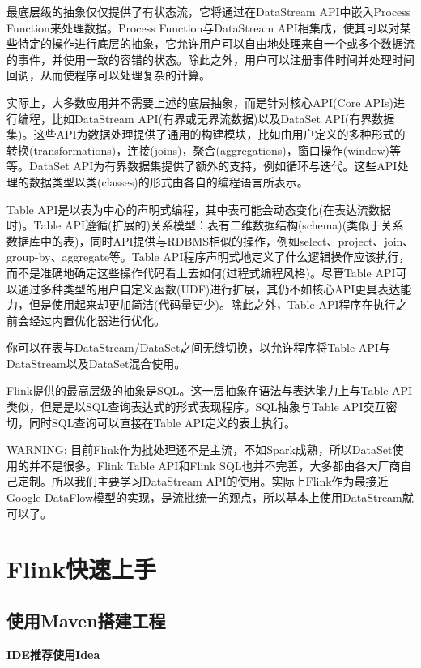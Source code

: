\documentclass{ctexart}
\begin{document}
最底层级的抽象仅仅提供了有状态流，它将通过在DataStream API中嵌入Process Function来处理数据。Process Function与DataStream API相集成，使其可以对某些特定的操作进行底层的抽象，它允许用户可以自由地处理来自一个或多个数据流的事件，并使用一致的容错的状态。除此之外，用户可以注册事件时间并处理时间回调，从而使程序可以处理复杂的计算。

实际上，大多数应用并不需要上述的底层抽象，而是针对核心API(Core APIs)进行编程，比如DataStream API(有界或无界流数据)以及DataSet API(有界数据集)。这些API为数据处理提供了通用的构建模块，比如由用户定义的多种形式的转换(transformations)，连接(joins)，聚合(aggregations)，窗口操作(window)等等。DataSet API为有界数据集提供了额外的支持，例如循环与迭代。这些API处理的数据类型以类(classes)的形式由各自的编程语言所表示。

Table API是以表为中心的声明式编程，其中表可能会动态变化(在表达流数据时)。Table API遵循(扩展的)关系模型：表有二维数据结构(schema)(类似于关系数据库中的表)，同时API提供与RDBMS相似的操作，例如select、project、join、group-by、aggregate等。Table API程序声明式地定义了什么逻辑操作应该执行，而不是准确地确定这些操作代码看上去如何(过程式编程风格)。尽管Table API可以通过多种类型的用户自定义函数(UDF)进行扩展，其仍不如核心API更具表达能力，但是使用起来却更加简洁(代码量更少)。除此之外，Table API程序在执行之前会经过内置优化器进行优化。

你可以在表与DataStream/DataSet之间无缝切换，以允许程序将Table API与DataStream以及DataSet混合使用。

Flink提供的最高层级的抽象是SQL。这一层抽象在语法与表达能力上与Table API类似，但是是以SQL查询表达式的形式表现程序。SQL抽象与Table API交互密切，同时SQL查询可以直接在Table API定义的表上执行。

WARNING: 目前Flink作为批处理还不是主流，不如Spark成熟，所以DataSet使用的并不是很多。Flink Table API和Flink SQL也并不完善，大多都由各大厂商自己定制。所以我们主要学习DataStream API的使用。实际上Flink作为最接近Google DataFlow模型的实现，是流批统一的观点，所以基本上使用DataStream就可以了。

\section{Flink快速上手}

\subsection{使用Maven搭建工程}

\textbf{IDE推荐使用Idea}
\end{document}
